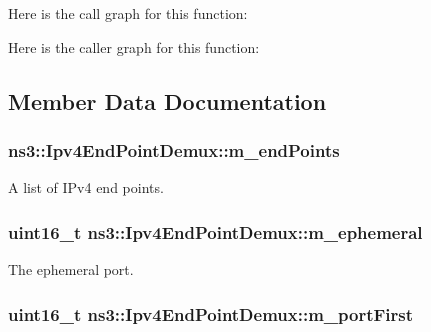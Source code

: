 Here is the call graph for this function\+:




Here is the caller graph for this function\+:




\subsection{Member Data Documentation}
\subsubsection[{\texorpdfstring{m\+\_\+end\+Points}{m_endPoints}}]{ ns3\+::\+Ipv4\+End\+Point\+Demux\+::m\+\_\+end\+Points\hspace{0.3cm}{\ttfamily [private]}}\hypertarget{classns3_1_1Ipv4EndPointDemux_a3a0f7107698fe56cf60b2a0647682cdf}{}\label{classns3_1_1Ipv4EndPointDemux_a3a0f7107698fe56cf60b2a0647682cdf}


A list of I\+Pv4 end points. 

\subsubsection[{\texorpdfstring{m\+\_\+ephemeral}{m_ephemeral}}]{\setlength{\rightskip}{0pt plus 5cm}uint16\+\_\+t ns3\+::\+Ipv4\+End\+Point\+Demux\+::m\+\_\+ephemeral\hspace{0.3cm}{\ttfamily [private]}}\hypertarget{classns3_1_1Ipv4EndPointDemux_ab06ea605c5e81b34971468d1244a7c45}{}\label{classns3_1_1Ipv4EndPointDemux_ab06ea605c5e81b34971468d1244a7c45}


The ephemeral port. 

\subsubsection[{\texorpdfstring{m\+\_\+port\+First}{m_portFirst}}]{\setlength{\rightskip}{0pt plus 5cm}uint16\+\_\+t ns3\+::\+Ipv4\+End\+Point\+Demux\+::m\+\_\+port\+First\hspace{0.3cm}{\ttfamily [private]}}\hypertarget{classns3_1_1Ipv4EndPointDemux_a0407d0c9cc04dd29a887eabeb3fc1c89}{}\label{classns3_1_1Ipv4EndPointDemux_a0407d0c9cc04dd29a887eabeb3fc1c89}


